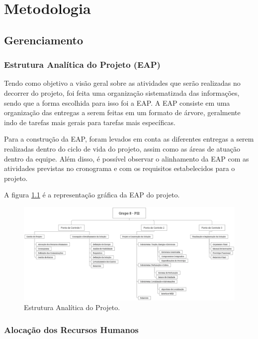 \chapter{Metodologia}
  \section{Gerenciamento}
    \subsection{Estrutura Analítica do Projeto (EAP)}

      Tendo como objetivo a visão geral sobre as atividades que serão
      realizadas no decorrer do projeto, foi feita uma organização
      sistematizada das informações, sendo que a forma escolhida para
      isso foi a EAP. A EAP consiste em uma organização das entregas
      a serem feitas em um formato de árvore, geralmente indo de tarefas
      mais gerais para tarefas mais específicas. 
      
      Para a construção da EAP, foram levados em conta as diferentes
      entregas a serem realizadas dentro do ciclo de vida do projeto,
      assim como as áreas de atuação dentro da equipe. Além disso, é
      possível observar o alinhamento da EAP com as atividades previstas
      no cronograma e com os requisitos estabelecidos para o projeto. 
      
      A figura \ref{fig:eap} é a representação gráfica da EAP do projeto.

      \begin{figure}[!htbp]
      \begin{center}
      \includegraphics[width=\textwidth]{figuras/EAP.eps}
      \caption{\label{fig:eap}Estrutura Analítica do Projeto.}
      \end{center}
      \end{figure}

    \subsection{Alocação dos Recursos Humanos}

